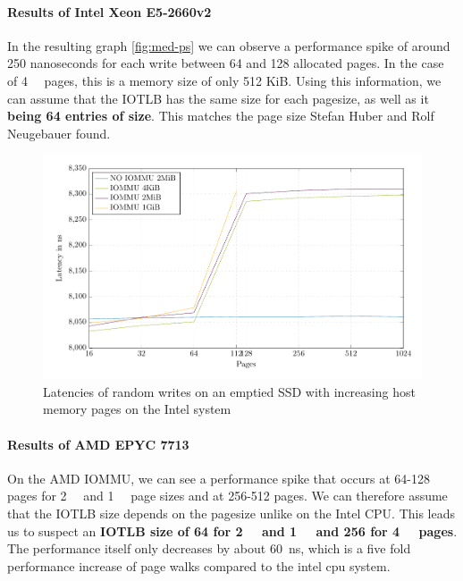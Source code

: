 \paragraph{Results of Intel Xeon E5-2660v2}
In the resulting graph \autoref{fig:med-ps} we can observe a performance spike of around 250 nanoseconds for each write between 64 and 128 allocated pages. In the case of \qty{4}{\kibi\byte} pages, this is a memory size of only 512 KiB. Using this information, we can assume that the IOTLB has the same size for each pagesize, as well as it \textbf{being 64 entries of size}. This matches the page size Stefan Huber and Rolf Neugebauer found.

\begin{figure}[H]
  \centering
  \includegraphics[width=\textwidth]{figures/psmeds}
  \caption{Latencies of random writes on an emptied SSD with increasing host memory pages on the Intel system}
  \label{fig:med-ps}
\end{figure}

\paragraph{Results of AMD EPYC 7713}
On the AMD IOMMU, we can see a performance spike that occurs at 64-128 pages for \qty{2}{\mebi\byte} and \qty{1}{\gibi\byte} page sizes and at 256-512 pages. We can therefore assume that the IOTLB size depends on the pagesize unlike on the Intel CPU. This leads us to suspect an \textbf{IOTLB size of 64 for \qty{2}{\mebi\byte} and \qty{1}{\gibi\byte} and 256 for \qty{4}{\kibi\byte} pages}. The performance itself only decreases by about \qty{60}{ns}, which is a five fold performance increase of page walks compared to the intel cpu system.

